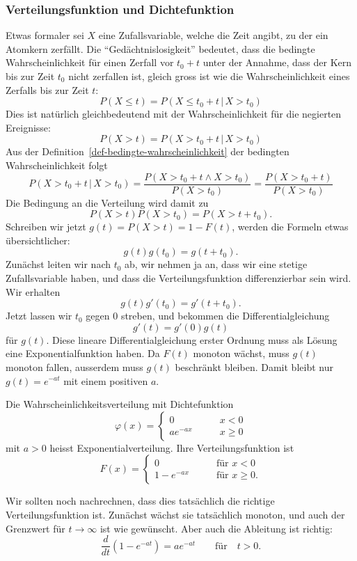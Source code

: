 \subsubsection{Verteilungsfunktion und Dichtefunktion}
Etwas formaler sei $X$ eine Zufallsvariable, welche die Zeit angibt, zu der
ein Atomkern zerfällt.
Die ``Gedächtnislosigkeit'' bedeutet, dass die
bedingte Wahrscheinlichkeit für einen Zerfall vor $t_0+t$ unter der
Annahme, dass der Kern bis zur Zeit $t_0$ nicht zerfallen ist, gleich
gross ist wie die Wahrscheinlichkeit eines Zerfalls bis zur Zeit $t$:
\[
P(X \le t) = P(X\le t_0+t\,|\,X > t_0)
\]
Dies ist natürlich gleichbedeutend mit der Wahrscheinlichkeit für
die negierten Ereignisse:
\[
P(X > t) = P(X > t_0+t\,|\,X > t_0)
\]
Aus der Definition~\ref{def-bedingte-wahrscheinlichkeit}
der bedingten Wahrscheinlichkeit folgt
\[
P(X> t_0+t\,|\,X>t_0)=\frac{P(X>t_0+t\wedge X>t_0)}{P(X > t_0)}
=\frac{P(X>t_0+t)}{P(X>t_0)}
\]
Die Bedingung an die Verteilung wird damit zu
\[
P(X>t)P(X>t_0)=P(X>t+t_0).
\]
Schreiben wir jetzt $g(t)=P(X>t)=1-F(t)$, werden die Formeln
etwas übersichtlicher:
\[
g(t)g(t_0)=g(t+t_0).
\]
Zunächst leiten wir nach $t_0$ ab, wir nehmen ja an, dass wir
eine stetige Zufallsvariable haben, und dass die Verteilungsfunktion
differenzierbar sein wird.
Wir erhalten
\[
g(t)g'(t_0)=g'(t+t_0).
\]
Jetzt lassen wir $t_0$ gegen $0$ streben, und bekommen
die Differentialgleichung
\[
g'(t)=g'(0)g(t)
\]
für $g(t)$.
Diese lineare Differentialgleichung erster Ordnung
muss als Lösung eine Exponentialfunktion haben.
Da $F(t)$
monoton wächst, muss $g(t)$ monoton fallen, ausserdem
muss $g(t)$ beschränkt bleiben.
Damit bleibt nur
$g(t)=e^{-at}$ mit einem positiven $a$.

\begin{definition}
Die Wahrscheinlichkeitsverteilung mit Dichtefunktion
\[
\varphi(x)=\begin{cases}
0&\qquad x<0\\
a e^{-a x}&\qquad x\ge 0
\end{cases}
\]
mit $a>0$ heisst Exponentialverteilung.
Ihre Verteilungsfunktion ist
\[
F(x)=\begin{cases}
0&\qquad\text{für $x < 0$}\\
1-e^{-ax}&\qquad\text{für $x\ge 0$}.
\end{cases}
\]
\end{definition}
Wir sollten noch nachrechnen, dass dies tatsächlich die richtige
Verteilungsfunktion ist.
Zunächst wächst sie tatsächlich monoton,
und auch der Grenzwert für $t\to\infty$ ist wie gewünscht.
Aber
auch die Ableitung ist richtig:
\[
\frac{d}{dt}(1-e^{-at})=ae^{-at}\qquad\text{für}\quad t>0.
\]

